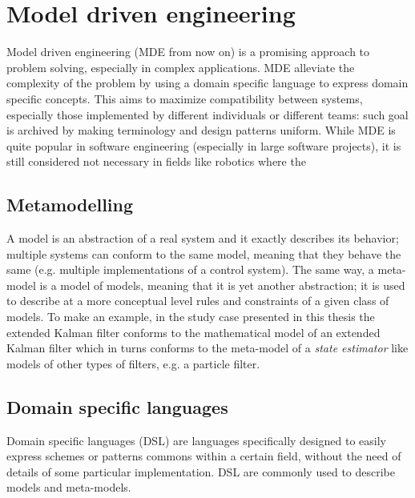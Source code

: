 \chapter{Model driven engineering}
\label{ch:mdl}
Model driven engineering (MDE from now on) is a promising approach to problem solving, especially in complex applications. MDE alleviate the complexity of the problem by using a domain specific language to express domain specific concepts. This aims to maximize compatibility between systems, especially those implemented by different individuals or different teams: such goal is archived by making terminology and design patterns uniform.
While MDE is quite popular in software engineering (especially in large software projects), it is still considered not necessary in fields like robotics where the

\section{Metamodelling}
A model is an abstraction of a real system and it exactly describes its behavior; multiple systems can conform to the same model, meaning that they behave the same (e.g. multiple implementations of a control system).
The same way, a meta-model is a model of models, meaning that it is yet another abstraction; it is used to describe at a more conceptual level rules and constraints of a given class of models. To make an example, in the study case presented in this thesis the extended Kalman filter conforms to the mathematical model of an extended Kalman filter which in turns conforms to the meta-model of a \emph{state estimator} like models of other types of filters, e.g. a particle filter.

\section{Domain specific languages}
Domain specific languages (DSL) are languages specifically designed to easily express schemes or patterns commons within a certain field, without the need of details of some particular implementation. DSL are commonly used to describe models and meta-models.

